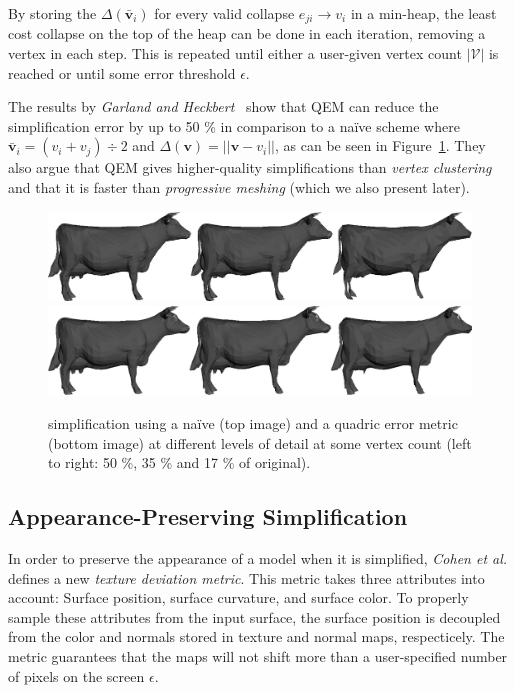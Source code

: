 By storing the \(\Delta(\mathbf{\bar{v}}_i)\) for every valid collapse \(e_{ji} \rightarrow v_i\) in a min-heap, the least cost collapse on the top of the heap can be done in each iteration, removing a vertex in each step. This is repeated until either a user-given vertex count \(|\mathcal{V}|\) is reached or until some error threshold \(\epsilon\).

The results by \emph{Garland and Heckbert}~\cite{garland1998simplifying} show that QEM can reduce the simplification error by up to 50 \% in comparison to a na\"ive scheme where \(\mathbf{\bar{v}}_i = (v_i + v_j) \div 2\) and \(\Delta(\mathbf{v}) = ||\mathbf{v} - v_i||\), as can be seen in Figure~\ref{fig:naive_vs_quadric}. They also argue that QEM gives higher-quality simplifications than \emph{vertex clustering} and that it is faster than \emph{progressive meshing} (which we also present later).

\begin{figure}[h]
    \centering
    \includegraphics[width=\textwidth]{figures/naive_simplification.png}
    \includegraphics[width=\textwidth]{figures/quadric_simplification.png}
    \caption{simplification using a na\"ive (top image) and a quadric error metric (bottom image) at different levels of detail at some vertex count (left to right: 50 \%, 35 \% and 17 \% of original).}
    \label{fig:naive_vs_quadric}
\end{figure}

\subsection{Appearance-Preserving Simplification} \label{sec:appearance-preserving_simplification}
In order to preserve the appearance of a model when it is simplified, \emph{Cohen et al.} \cite{cohen1998appearance} defines a new \emph{texture deviation metric}. This metric takes three attributes into account: Surface position, surface curvature, and surface color. To properly sample these attributes from the input surface, the surface position is decoupled from the color and normals stored in texture and normal maps, respecticely. The metric guarantees that the maps will not shift more than a user-specified number of pixels on the screen $\epsilon$.

